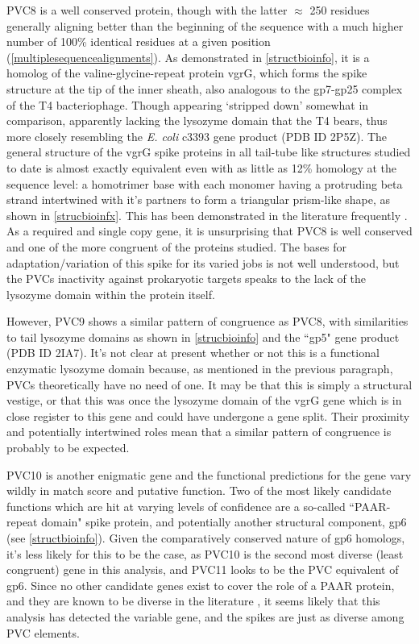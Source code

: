 PVC8 is a well conserved protein, though with the latter $\approx$ 250 residues generally aligning better than the beginning of the sequence with a much higher number of 100\% identical residues at a given position (\vref{multiplesequencealignments}). As demonstrated in \vref{structbioinfo}, it is a homolog of the valine-glycine-repeat protein vgrG, which forms the spike structure at the tip of the inner sheath, also analogous to the gp7-gp25 complex of the T4 bacteriophage. Though appearing `stripped down' somewhat in comparison, apparently lacking the lysozyme domain that the T4 bears, thus more closely resembling the \emph{E. coli} c3393 gene product (PDB ID 2P5Z). The general structure of the vgrG spike proteins in all tail-tube like structures studied to date is almost exactly equivalent even with as little as 12\% homology at the sequence level: a homotrimer base with each monomer having a protruding beta strand intertwined with it's partners to form a triangular prism-like shape, as shown in \vref{strucbioinfx}. This has been demonstrated in the literature frequently \citep{Leiman2009}. As a required and single copy gene, it is unsurprising that PVC8 is well conserved and one of the more congruent of the proteins studied. The bases for adaptation/variation of this spike for its varied jobs is not well understood, but the PVCs inactivity against prokaryotic targets speaks to the lack of the lysozyme domain within the protein itself.

However, PVC9 shows a similar pattern of congruence as PVC8, with similarities to tail lysozyme domains as shown in \vref{strucbioinfo} \citep{Arisaka2003} and the ``gp5" gene product (PDB ID 2IA7). It's not clear at present whether or not this is a functional enzymatic lysozyme domain because, as mentioned in the previous paragraph, PVCs theoretically have no need of one. It may be that this is simply a structural vestige, or that this was once the lysozyme domain of the vgrG gene which is in close register to this gene and could have undergone a gene split. Their proximity and potentially intertwined roles mean that a similar pattern of congruence is probably to be expected.

PVC10 is another enigmatic gene and the functional predictions for the gene vary wildly in match score and putative function. Two of the most likely candidate functions which are hit at varying levels of confidence are a so-called ``PAAR-repeat domain" spike protein, and potentially another structural component, gp6 (see \vref{structbioinfo}). Given the comparatively conserved nature of gp6 homologs, it's less likely for this to be the case, as PVC10 is the second most diverse (least congruent) gene in this analysis, and PVC11 looks to be the PVC equivalent of gp6. Since no other candidate genes exist to cover the role of a PAAR protein, and they are known to be diverse in the literature \citep{Shneider2013}, it seems likely that this analysis has detected the variable gene, and the spikes are just as diverse among PVC elements.

